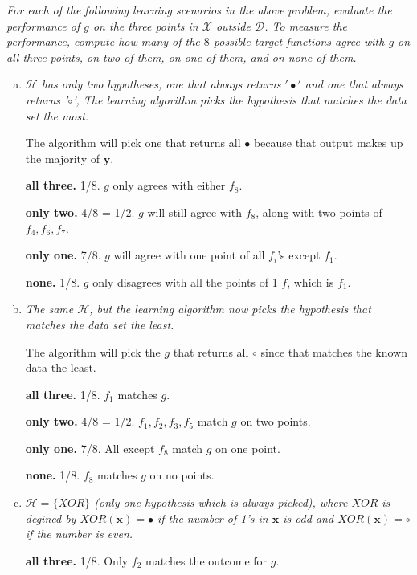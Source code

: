 \documentclass{article}
\renewcommand{\vec}[1]{\mathbf{#1}}
\begin{document}
\textit{For each of the following learning scenarios in the above problem, evaluate the performance of $g$ on the three points in $\mathscr{X}$ outside $\mathscr{D}$. To measure the performance, compute how many of the $8$ possible target functions agree with $g$ on all three points, on two of them, on one of them, and on none of them.}

\begin{enumerate}[(a)]
    
	\item \textit{$\mathscr{H}$ has only two hypotheses, one that always returns $'\bullet'$ and one that always returns '$\circ$', The learning algorithm picks the hypothesis that matches the data set the most.}
	
    The algorithm will pick one that returns all $\bullet$ because that output makes up the 
    majority of $\vec{y}$.

    \textbf{all three.} 1/8. $g$ only agrees with either $f_8$.

    \textbf{only two.} 4/8 = 1/2. $g$ will still agree with $f_8$, along with two points of 
    $f_4, f_6, f_7$.

    \textbf{only one.} 7/8. $g$ will agree with one point of all $f_i$'s except $f_1$.
	
    \textbf{none.} 1/8. $g$ only disagrees with all the points of 1 $f$, which is $f_1$.


	\item \textit{The same $\mathscr{H}$, but the learning algorithm now picks the hypothesis that matches the data set the least.}
	
    The algorithm will pick the $g$ that returns all $\circ$ since that matches the known data 
    the least.

    \textbf{all three.} 1/8. $f_1$ matches $g$.


    \textbf{only two.} 4/8 = 1/2. $f_1, f_2, f_3, f_5$ match $g$ on two points.


    \textbf{only one.} 7/8. All except $f_8$ match $g$ on one point.


    \textbf{none.} 1/8. $f_8$ matches $g$ on no points.

	
	\item \textit{$\mathscr{H} = \{XOR\}$ (only one hypothesis which is always picked), where $XOR$ is degined by $XOR(\vec{x}) =  \bullet$ if the number of 1's in $\vec{x}$ is odd and $XOR(\vec{x}) =  \circ$ if the number is even.}
	
    \textbf{all three.} 1/8. Only $f_2$ matches the outcome for $g$.



\end{enumerate}
\end{document}
